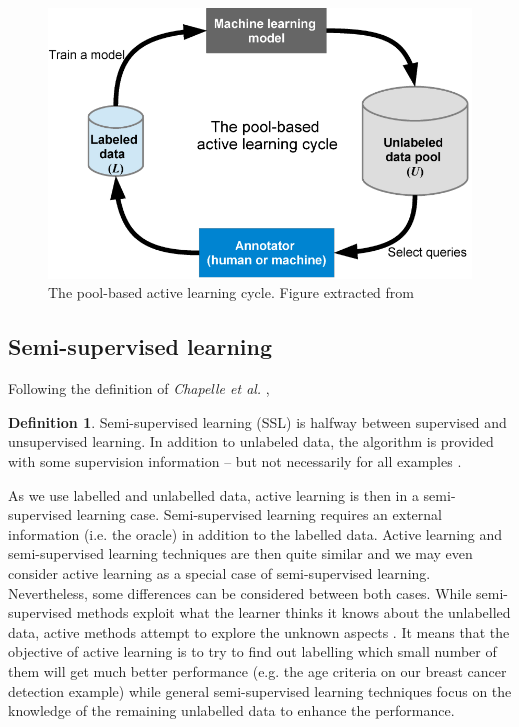 \documentclass[11pt, openany]{report}
\theoremstyle{plain}
\theoremstyle{definition}
\newtheorem{defn}{Definition}[section]
\theoremstyle{remark}
\begin{document}
\begin{figure}[H]
  \centering
  \includegraphics[scale=0.45]{figures/AL-process.png}
  \caption{The pool-based active learning cycle. Figure extracted from \cite{AL-figure}}
  \label{fig:AL-process}
\end{figure}

\subsection{Semi-supervised learning} \label{sec:SSL}
Following the definition of \textit{Chapelle et al.} \cite{book-SSL}, 

\begin{defn}
Semi-supervised learning (SSL) is halfway between supervised and unsupervised learning. In addition to unlabeled data, the algorithm is provided with some supervision information – but not necessarily for all examples \cite{book-SSL}. 
\end{defn}

As we use labelled and unlabelled data, active learning is then in a semi-supervised learning case. Semi-supervised learning requires an external information (i.e. the oracle) in addition to the labelled data. Active learning and semi-supervised learning techniques are then quite similar and we may even consider active learning as a special case of semi-supervised learning. Nevertheless, some differences can be considered between both cases. While semi-supervised methods exploit what the learner thinks it knows about the unlabelled data, active methods attempt to explore the unknown aspects \cite{AL-Survey}.  It means that the objective of active learning is to try to find out labelling which small number of them will get much better performance (e.g. the age criteria on our breast cancer detection example) while general semi-supervised learning techniques focus on the knowledge of the remaining unlabelled data to enhance the performance.
\end{document}
